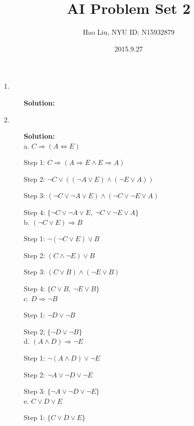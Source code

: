\documentclass{article}
\begin{document}
\title{AI Problem Set 2}
\author{{\normalsize Hao Liu, NYU ID: N15932879}}
\date{2015.9.27}
\maketitle

\def \Pr{{\rm Pr}}


\baselineskip 0.6cm

\begin{description}


\item[1. ] \textbf{Solution:}\\

\item[2. ] \textbf{Solution:}\\

a.
$C\Rightarrow(A\Leftrightarrow E)$

Step 1:
$ C\Rightarrow (A\Rightarrow E \wedge E \Rightarrow A) $

Step 2:
$ \neg C \vee ((\neg A \vee E)\wedge (\neg E \vee A)) $

Step 3:
$ (\neg C \vee \neg A \vee E) \wedge (\neg C \vee \neg E \vee A)  $

Step 4:
$ \{\neg C \vee \neg A \vee E , \: \neg C \vee \neg E \vee A \} $ \\

b.
$ (\neg C \vee E)\Rightarrow B $

Step 1:
$ \neg (\neg C \vee E)\vee B $

Step 2:
$ (C \wedge \neg E) \vee B $

Step 3:
$ (C \vee B) \wedge (\neg E \vee B) $

Step 4:
$ \{C \vee B, \: \neg E \vee B \} $\\

c.
$ D \Rightarrow \neg B $

Step 1:
$ \neg D \vee \neg B $

Step 2;
$ \{ \neg D \vee \neg B \} $\\

d.
$ (A \wedge D)\Rightarrow \neg E $

Step 1:
$ \neg(A \wedge D) \vee \neg E $

Step 2:
$ \neg A \vee \neg D \vee \neg E $

Step 3:
$ \{  \neg A \vee \neg D \vee \neg E \} $\\

e.
$C \vee D \vee E$

Step 1:
$ \{ C \vee D \vee E\} $\\


\end{description}
\end{document}
